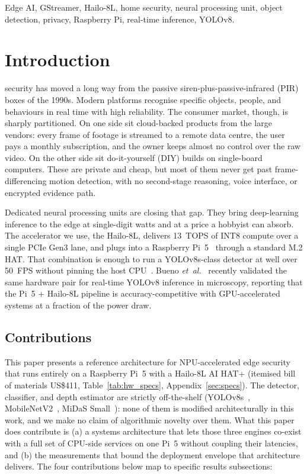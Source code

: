 \documentclass{ieeeaccess}
\begin{document}
\begin{keywords}
Edge AI, GStreamer, Hailo-8L, home security, neural processing unit, object detection, privacy, Raspberry Pi, real-time inference, YOLOv8.
\end{keywords}

\titlepgskip=-21pt

\maketitle

\section{Introduction}
\label{sec:introduction}
 security has moved a long way from the passive siren-plus-passive-infrared (PIR) boxes of the 1990s. Modern platforms recognise specific objects, people, and behaviours in real time with high reliability. The consumer market, though, is sharply partitioned. On one side sit cloud-backed products from the large vendors: every frame of footage is streamed to a remote data centre, the user pays a monthly subscription, and the owner keeps almost no control over the raw video. On the other side sit do-it-yourself (DIY) builds on single-board computers. These are private and cheap, but most of them never get past frame-differencing motion detection, with no second-stage reasoning, voice interface, or encrypted evidence path.

Dedicated neural processing units are closing that gap. They bring deep-learning inference to the edge at single-digit watts and at a price a hobbyist can absorb. The accelerator we use, the Hailo-8L, delivers 13~TOPS of INT8 compute over a single PCIe Gen3 lane, and plugs into a Raspberry Pi~5~\cite{b11} through a standard M.2 HAT. That combination is enough to run a YOLOv8s-class detector at well over 50~FPS without pinning the host CPU~\cite{b3}. Bueno \emph{et~al.}~\cite{b4} recently validated the same hardware pair for real-time YOLOv8 inference in microscopy, reporting that the Pi~5 + Hailo-8L pipeline is accuracy-competitive with GPU-accelerated systems at a fraction of the power draw.

\subsection{Contributions}
This paper presents a reference architecture for NPU-accelerated edge security that runs entirely on a Raspberry Pi~5 with a Hailo-8L AI HAT+ (itemised bill of materials US\$411, Table~\ref{tab:hw_specs}, Appendix~\ref{sec:specs}). The detector, classifier, and depth estimator are strictly off-the-shelf (YOLOv8s~\cite{b9}, MobileNetV2~\cite{b15}, MiDaS Small~\cite{b14}): none of them is modified architecturally in this work, and we make no claim of algorithmic novelty over them. What this paper does contribute is (a) a systems architecture that lets those three engines co-exist with a full set of CPU-side services on one Pi~5 without coupling their latencies, and (b) the measurements that bound the deployment envelope that architecture delivers. The four contributions below map to specific results subsections:
\end{document}
